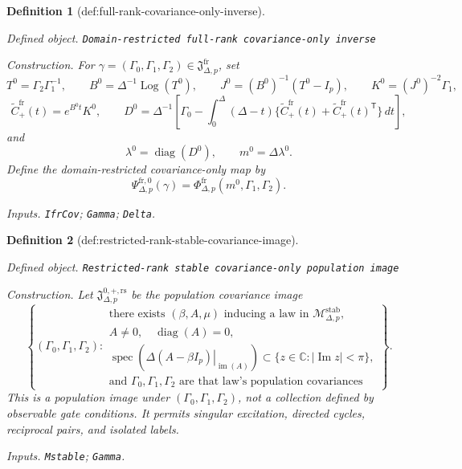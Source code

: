 \documentclass{article}
\newtheorem{definition}{Definition}
\begin{document}
\begin{definition}[def:full-rank-covariance-only-inverse]\label{def:full-rank-covariance-only-inverse}
\par\smallskip\noindent\emph{Defined object.} \texttt{Domain-\allowbreak{}restricted full-\allowbreak{}rank covariance-\allowbreak{}only inverse}
\par\smallskip\noindent\emph{Construction.} For \(\gamma=(\Gamma_0,\Gamma_1,\Gamma_2)\in\mathfrak J_{\Delta,p}^{\mathrm{fr}}\), set
\[
 T^0=\Gamma_2\Gamma_1^{-1},\qquad
 B^0=\Delta^{-1}\operatorname{Log}(T^0),\qquad
 J^0=(B^0)^{-1}(T^0-I_p),\qquad
 K^0=(J^0)^{-2}\Gamma_1,
\]
\[
 \widetilde C_{+}^{\mathrm{fr}}(t)=e^{B^0t}K^0,\qquad
 D^0=\Delta^{-1}\!\left[
 \Gamma_0-\int_0^\Delta(\Delta-t)
 \{\widetilde C_{+}^{\mathrm{fr}}(t)
   +\widetilde C_{+}^{\mathrm{fr}}(t)^{\mathsf T}\}\,dt\right],
\]
and
\[
 \lambda^0=\operatorname{diag}(D^0),\qquad m^0=\Delta\lambda^0.
\]
Define the domain-restricted covariance-only map by
\[
 \Psi_{\Delta,p}^{\mathrm{fr},0}(\gamma)
 =\Phi_{\Delta,p}^{\mathrm{fr}}(m^0,\Gamma_1,\Gamma_2).
\]
\par\smallskip\noindent\emph{Inputs.} \texttt{IfrCov}; \texttt{Gamma}; \texttt{Delta}.
\end{definition}

\begin{definition}[def:restricted-rank-stable-covariance-image]\label{def:restricted-rank-stable-covariance-image}
\par\smallskip\noindent\emph{Defined object.} \texttt{Restricted-\allowbreak{}rank stable covariance-\allowbreak{}only population image}
\par\smallskip\noindent\emph{Construction.} Let \(\mathfrak J_{\Delta,p}^{0,+,\mathrm{rs}}\) be the population covariance image
\[
 \left\{(\Gamma_0,\Gamma_1,\Gamma_2):\begin{array}{l}
 \text{there exists }(\beta,A,\mu)\text{ inducing a law in }\mathcal M_{\Delta,p}^{\mathrm{stab}},\\
 A\neq0,\quad \operatorname{diag}(A)=0,\\
 \operatorname{spec}\!\left(
 \left.\Delta(A-\beta I_p)\right|_{\operatorname{im}(A)}\right)
 \subset\{z\in\mathbb C:|\operatorname{Im}z|<\pi\},\\
 \text{and }\Gamma_0,\Gamma_1,\Gamma_2\text{ are that law's population covariances}
 \end{array}\right\}.
\]
This is a population image under \((\Gamma_0,\Gamma_1,\Gamma_2)\), not a collection defined by observable gate conditions.  It permits singular excitation, directed cycles, reciprocal pairs, and isolated labels.
\par\smallskip\noindent\emph{Inputs.} \texttt{Mstable}; \texttt{Gamma}.
\end{definition}
\end{document}
